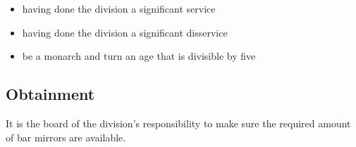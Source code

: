 \documentclass[a4paper]{dtek}
\begin{document}
\begin{itemize}
    \item having done the division a significant service
    \item having done the division a significant disservice
    \item be a monarch and turn an age that is divisible by five
\end{itemize}

\subsection{Obtainment}
It is the board of the division's responsibility to make sure the required amount of bar mirrors are available. 
\end{document}
